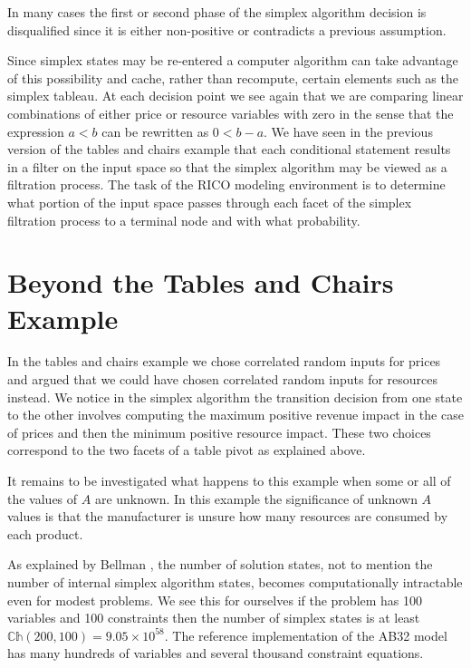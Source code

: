 
In many cases the first or second phase of the simplex algorithm
decision is disqualified since it is either non-positive or contradicts
a previous assumption. 

Since simplex states may be re-entered a computer algorithm can take
advantage of this possibility and cache, rather than recompute, certain
elements such as the simplex tableau. At each decision point we see
again that we are comparing linear combinations of either price or
resource variables with zero in the sense that the expression $a < b$
can be rewritten as $0 < b - a$. We have seen in the previous version
of the tables and chairs example that each conditional statement
results in a filter on the input space so that the simplex algorithm
may be viewed as a filtration process. The task of the RICO modeling
environment is to determine what portion of the input space passes through
each facet of the simplex filtration process to a terminal node and
with what probability.

\section{Beyond the Tables and Chairs Example}

In the tables and chairs example we chose correlated random inputs for
prices and argued that we could have chosen correlated random inputs
for resources instead. We notice in the simplex algorithm the
transition decision from one state to the other involves computing the
maximum positive revenue impact in the case of prices and then the
minimum positive resource impact. These two choices correspond to the
two facets of a table pivot as explained above. 

It remains to be investigated what happens to this example when some
or all of the values of $A$ are unknown. In this example the
significance of unknown $A$ values is that the manufacturer is unsure
how many resources are consumed by each product.

As explained by Bellman \cite{bellman03}, the number of solution
states, not to mention the number of internal simplex algorithm
states, becomes computationally intractable even for modest
problems. We see this for ourselves if the problem has 100 variables
and 100 constraints then the number of simplex states is at least
$\mathbb{Ch}(200,100) = 9.05\times10^{58}$. The reference implementation
of the AB32 model has many hundreds of variables and several thousand
constraint equations. 

